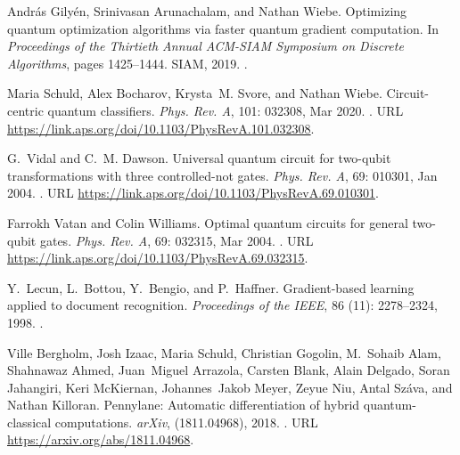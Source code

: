 \documentclass[letterpaper,preprintnumbers,preprint,aps,accepted=2022-05-26]{quantumarticle}
\begin{document}
\begin{thebibliography}{39}
Andr{\'a}s Gily{\'e}n, Srinivasan Arunachalam, and Nathan Wiebe.
\newblock Optimizing quantum optimization algorithms via faster quantum
  gradient computation.
\newblock In \emph{Proceedings of the Thirtieth Annual ACM-SIAM Symposium on
  Discrete Algorithms}, pages 1425--1444. SIAM, 2019.
\newblock {}.

Maria Schuld, Alex Bocharov, Krysta~M. Svore, and Nathan Wiebe.
\newblock Circuit-centric quantum classifiers.
\newblock \emph{Phys. Rev. A}, 101: 032308, Mar 2020.
\newblock {}.
\newblock URL \url{https://link.aps.org/doi/10.1103/PhysRevA.101.032308}.

G.~Vidal and C.~M. Dawson.
\newblock Universal quantum circuit for two-qubit transformations with three
  controlled-not gates.
\newblock \emph{Phys. Rev. A}, 69: 010301, Jan 2004.
\newblock {}.
\newblock URL \url{https://link.aps.org/doi/10.1103/PhysRevA.69.010301}.

Farrokh Vatan and Colin Williams.
\newblock Optimal quantum circuits for general two-qubit gates.
\newblock \emph{Phys. Rev. A}, 69: 032315, Mar 2004.
\newblock {}.
\newblock URL \url{https://link.aps.org/doi/10.1103/PhysRevA.69.032315}.

Y.~{Lecun}, L.~{Bottou}, Y.~{Bengio}, and P.~{Haffner}.
\newblock Gradient-based learning applied to document recognition.
\newblock \emph{Proceedings of the IEEE}, 86 (11):
  2278--2324, 1998.
\newblock {}.

Ville Bergholm, Josh Izaac, Maria Schuld, Christian Gogolin, M.~Sohaib Alam,
  Shahnawaz Ahmed, Juan~Miguel Arrazola, Carsten Blank, Alain Delgado, Soran
  Jahangiri, Keri McKiernan, Johannes~Jakob Meyer, Zeyue Niu, Antal Száva, and
  Nathan Killoran.
\newblock Pennylane: Automatic differentiation of hybrid quantum-classical
  computations.
\newblock \emph{arXiv},  (1811.04968), 2018.
\newblock {}.
\newblock URL \url{https://arxiv.org/abs/1811.04968}.


\end{thebibliography}
\end{document}
